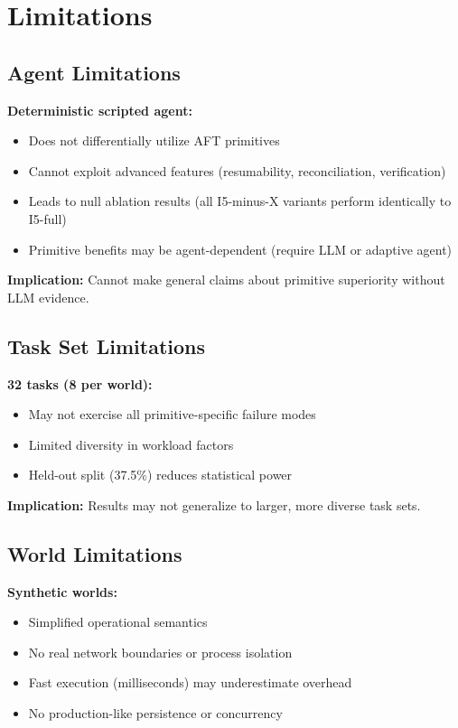 
\section{Limitations}

\subsection{Agent Limitations}

\textbf{Deterministic scripted agent:}
\begin{itemize}
    \item Does not differentially utilize AFT primitives
    \item Cannot exploit advanced features (resumability, reconciliation, verification)
    \item Leads to null ablation results (all I5-minus-X variants perform identically to I5-full)
    \item Primitive benefits may be agent-dependent (require LLM or adaptive agent)
\end{itemize}

\textbf{Implication:} Cannot make general claims about primitive superiority without LLM evidence.

\subsection{Task Set Limitations}

\textbf{32 tasks (8 per world):}
\begin{itemize}
    \item May not exercise all primitive-specific failure modes
    \item Limited diversity in workload factors
    \item Held-out split (37.5\%) reduces statistical power
\end{itemize}

\textbf{Implication:} Results may not generalize to larger, more diverse task sets.

\subsection{World Limitations}

\textbf{Synthetic worlds:}
\begin{itemize}
    \item Simplified operational semantics
    \item No real network boundaries or process isolation
    \item Fast execution (milliseconds) may underestimate overhead
    \item No production-like persistence or concurrency
\end{itemize}

